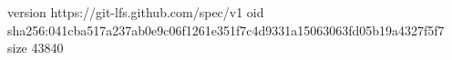 version https://git-lfs.github.com/spec/v1
oid sha256:041cba517a237ab0e9c06f1261e351f7c4d9331a15063063fd05b19a4327f5f7
size 43840
